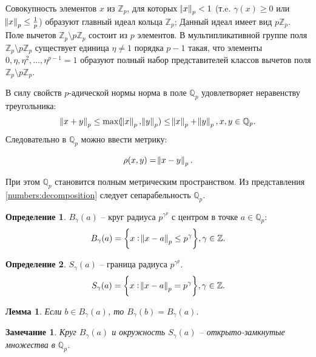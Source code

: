 \documentclass[master, och, diploma, times]{sty/SCWorks}
\theoremstyle{plain}
\newtheorem{lemma}{Лемма}[section]
\newtheorem{note}{Замечание}[section]
\theoremstyle{definition}
\newtheorem{defn}{Определение}[section]
\numberwithin{equation}{section}
\begin{document}
Совокупность элементов $x$ из $\mathbb {Z}_p$, для которых $\norm{x}_p < 1$ (т.e. $\gamma(x) \ge 0$ или $\norm{x}_p \le \frac{1}{p}$) образуют главный идеал кольца $\mathbb {Z}_p$; Данный идеал имеет вид $p\mathbb {Z}_p$. Поле вычетов $\mathbb {Z}_p \setminus p\mathbb {Z}_p$ состоит из $p$ элементов. В мультипликативной группе поля $\mathbb {Z}_p \setminus p\mathbb {Z}_p$ существует единица $\eta \ne 1$ порядка $p-1$ такая, что элементы $0, \eta, \eta^2, \dots, \eta^{p-1} = 1$ образуют полный набор представителей классов вычетов поля $\mathbb {Z}_p \setminus p\mathbb {Z}_p$.

В силу свойств $p$-адической нормы норма в поле $\mathbb {Q}_p$ удовлетворяет неравенству треугольника:
\begin{equation}
\norm{x + y}_p \le \max(\norm{x}_p, \norm{y}_p) \le \norm{x}_p + \norm{y}_p, x,y \in \mathbb {Q}_p.
\end{equation}
\noindent Следовательно в $\mathbb {Q}_p$ можно ввести метрику:

\begin{equation}
	\rho (x,y)=\norm{x-y}_p.
\end{equation}

\noindent При этом $\mathbb {Q}_p$ становится полным метрическим пространством. Из представления \eqref{numbers:decomposition} следует сепарабельность $\mathbb {Q}_p$.  

\begin{defn}
$B_{\gamma}(a)$ -- круг радиуса $p^{\gamma^p}$ с центром в точке $a \in \mathbb {Q}_p$:
\begin{equation}
	B_\gamma(a) = \bigg\{x: \norm{x-a}_p \le p^{\gamma} \bigg\}, \gamma \in \mathbb {Z}.
\end{equation}
\end{defn}

\begin{defn}
$S_{\gamma}(a)$ -- граница радиуса $p^{\gamma^p}$.
\begin{equation}
	S_\gamma(a) = \bigg\{x: \norm{x-a}_p = p^{\gamma} \bigg\}, \gamma \in \mathbb {Z}.
\end{equation}
\end{defn}

\begin{lemma}
Если $b \in B_{\gamma}(a)$, то $B_{\gamma}(b)=B_{\gamma}(a)$.
\end{lemma}

\begin{note}
Круг $B_{\gamma}(a)$ и окружность $S_{\gamma}(a)$ -- открыто-замкнутые множества в $\mathbb {Q}_p$.
\end{note}
\end{document}
